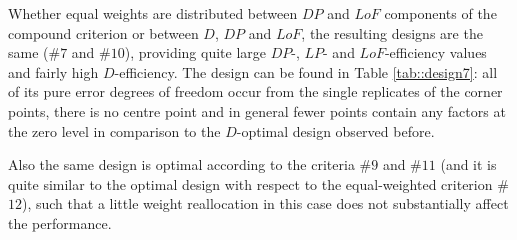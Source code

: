 Whether equal weights are distributed between $DP$ and $LoF$ components of the compound criterion or between $D$, $DP$ and $LoF$, the resulting designs are the same (\#$7$ and \#$10$), providing quite large $DP$-, $LP$- and $LoF$-efficiency values and fairly high $D$-efficiency. The design can be found in Table \ref{tab::design7}: all of its pure error degrees of freedom occur from the single replicates of the corner points, there is no centre point and in general fewer points contain any factors at the zero level in comparison to the $D$-optimal design observed before.

\begin{table}[h]
\centering
\caption{Example 1. Optimal design with respect to the determinant based-criteria \#$7$ and \#$10$}
\label{tab::design7}
\end{table}
Also the same design is optimal according to the criteria \#$9$ and \#$11$ (and it is quite similar to the optimal design with respect to the equal-weighted criterion \#$12$), such that a little weight reallocation in this case does not substantially affect the performance.

